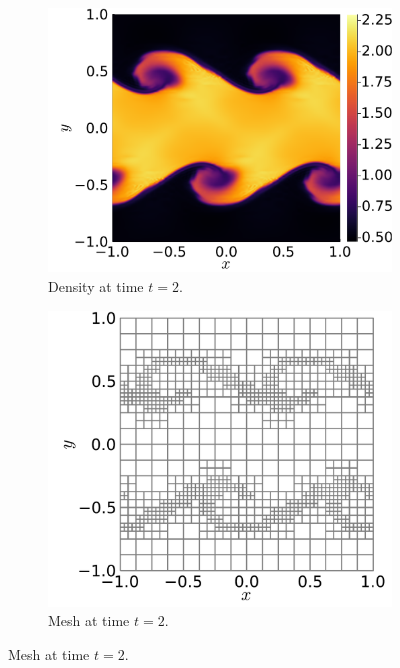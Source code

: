\documentclass{juliacon}
\begin{document}
\begin{figure}[htbp]
  \begin{subfigure}{0.53\linewidth}
    \includegraphics[width=\textwidth]{../figures/kelvin_helmholtz_density_t2}
    \caption{Density at time $t = 2$.}
  \end{subfigure}%
  \hspace*{\fill}
  \begin{subfigure}{0.47\linewidth}
    \includegraphics[width=\textwidth]{../figures/kelvin_helmholtz_mesh_t2}
    \caption{Mesh at time $t = 2$.}
  \end{subfigure}%

\end{figure}
\end{document}
